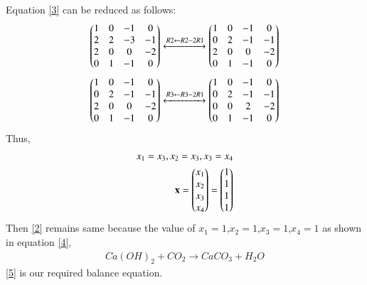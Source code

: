 \documentclass[journal,12pt,twocolumn]{IEEEtran}
\begin{document}
Equation \eqref{3} can be reduced as follows:
\begin{align}
   \begin{pmatrix}1 & 0 & -1 & 0\\
    2 & 2 & -3 & -1\\
    2 & 0 & 0 & -2\\
    0 & 1 & -1 & 0\end{pmatrix}\xleftrightarrow[]{R2\leftarrow R2-2R1}\begin{pmatrix}
1 & 0 & -1 & 0\\
0 & 2 & -1 & -1\\
2 & 0 & 0 & -2\\
0 & 1 & -1 & 0\end{pmatrix}
\end{align}
\begin{align}
   \begin{pmatrix}
1 & 0 & -1 & 0\\
0 & 2 & -1 & -1\\
2 & 0 & 0 & -2\\
0 & 1 & -1 & 0\end{pmatrix}\xleftrightarrow[]{R3\leftarrow R3-2R1} \begin{pmatrix}
1 & 0 & -1 & 0\\
0 & 2 & -1 & -1\\
0 & 0 & 2 & -2\\
0 & 1 & -1 & 0\end{pmatrix}
\end{align}
Thus,
\begin{align}
    x_1=x_3,x_2=x_3,x_3=x_4\\
    \mathbf{x}=\begin{pmatrix}x_1\\x_2\\x_3\\x_4\end{pmatrix}=\begin{pmatrix}1\\1\\1\\1\end{pmatrix}\label{4}
\end{align}
Then \eqref{2} remains same because the value of $x_1=1$,$x_2=1$,$x_3=1$,$x_4=1$ as shown in equation \eqref{4},
\begin{align}\label{5}
    \boxed{Ca(OH)_2 + CO_2 \xrightarrow{} CaCO_3 + H_2O}
\end{align}
 \eqref{5} is our required balance equation.
\end{document}
